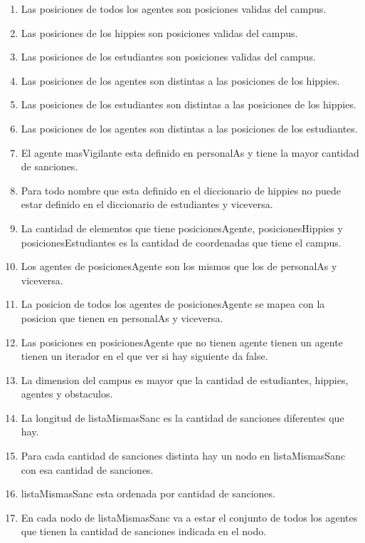\renewcommand{\labelenumi}{(\Roman{enumi})}

\begin{enumerate}
	\item Las posiciones de todos los agentes son posiciones validas del campus.
	\item Las posiciones de los hippies son posiciones validas del campus.
	\item Las posiciones de los estudiantes son posiciones validas del campus.
	\item Las posiciones de los agentes son distintas a las posiciones de los hippies.
	\item Las posiciones de los estudiantes son distintas a las posiciones de los hippies.
	\item Las posiciones de los agentes son distintas a las posiciones de los estudiantes.
	\item El agente masVigilante esta definido en personalAs y tiene la mayor cantidad de sanciones.
	\item Para todo nombre que esta definido en el diccionario de hippies no puede estar definido en el diccionario de estudiantes y viceversa.
	\item La cantidad de elementos que tiene posicionesAgente, posicionesHippies y posicionesEstudiantes es la cantidad de coordenadas que tiene el campus.
	\item Los agentes de posicionesAgente son los mismos que los de personalAs y viceversa.
	\item La posicion de todos los agentes de posicionesAgente se mapea con la posicion que tienen en personalAs y viceversa.

	\item Las posiciones en posicionesAgente que no tienen agente tienen un agente tienen un iterador en el que ver si hay siguiente da false.

	\item La dimension del campus es mayor que la cantidad de estudiantes, hippies, agentes y obstaculos.
	\item La longitud de listaMismasSanc es la cantidad de sanciones diferentes que hay.
	\item Para cada cantidad de sanciones distinta hay un nodo en listaMismasSanc con esa cantidad de sanciones.
	\item listaMismasSanc esta ordenada por cantidad de sanciones.
	\item En cada nodo de listaMismasSanc va a estar el conjunto de todos los agentes que tienen la cantidad de sanciones indicada en el nodo.


\end{enumerate}
